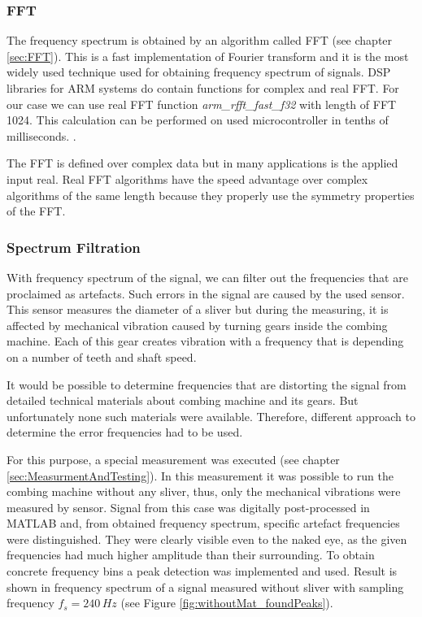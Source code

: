 \documentclass[twoside]{ctuthesis}
\theoremstyle{plain}
\theoremstyle{definition}
\theoremstyle{note}
\begin{document}
\subsubsection{FFT}
The frequency spectrum is obtained by an algorithm called FFT (see chapter \ref{sec:FFT}). This is a fast implementation of Fourier transform and it is the most widely used technique used for obtaining frequency spectrum of signals. DSP libraries for ARM systems do contain functions for complex and real FFT. For our case we can use real FFT function \textit{arm\_rfft\_fast\_f32} with length of FFT 1024. This calculation can be performed on used microcontroller in tenths of milliseconds. \cite{cite:STM32_DSP_library}.

The FFT is defined over complex data but in many applications is the applied input real. Real FFT algorithms have the speed advantage over complex algorithms of the same length because they properly use the symmetry properties of the FFT.

\subsubsection{Spectrum Filtration}
\label{sec:spectrumFiltration}
With frequency spectrum of the signal, we can filter out the frequencies that are proclaimed as artefacts. Such errors in the signal are caused by the used sensor. This sensor measures the diameter of a sliver but during the measuring, it is affected by mechanical vibration caused by turning gears inside the combing machine. Each of this gear creates vibration with a frequency that is depending on a number of teeth and shaft speed. 

It would be possible to determine frequencies that are distorting the signal from detailed technical materials about combing machine and its gears. But unfortunately none such materials were available. Therefore, different approach to determine the error frequencies had to be used. 

For this purpose, a special measurement was executed (see chapter \ref{sec:MeasurmentAndTesting}). In this measurement it was possible to run the combing machine without any sliver, thus, only the mechanical vibrations were measured by sensor. Signal from this case was digitally post-processed in MATLAB and, from obtained frequency spectrum, specific artefact frequencies were distinguished. They were clearly visible even to the naked eye, as the given frequencies had much higher amplitude than their surrounding. To obtain concrete frequency bins a peak detection was implemented and used. Result is shown in frequency spectrum of a signal measured without sliver with sampling frequency $f_s=240\,Hz$ (see Figure \ref{fig:withoutMat_foundPeaks}).
\end{document}
